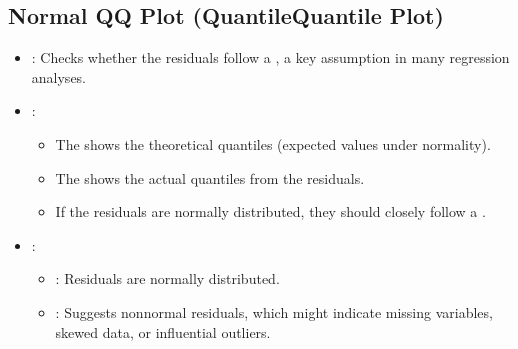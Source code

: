 \documentclass[letterpaper,10pt,english]{jupyterBook}
\begin{document}
\subsection{Normal Q\sphinxhyphen{}Q Plot (Quantile\sphinxhyphen{}Quantile Plot)}
\label{\detokenize{02:normal-q-q-plot-quantile-quantile-plot}}\begin{itemize}
\item {} 
\sphinxAtStartPar
{}: Checks whether the residuals follow a , a key assumption in many regression analyses.

\item {} 
\sphinxAtStartPar
{}:
\begin{itemize}
\item {} 
\sphinxAtStartPar
The  shows the theoretical quantiles (expected values under normality).

\item {} 
\sphinxAtStartPar
The  shows the actual quantiles from the residuals.

\item {} 
\sphinxAtStartPar
If the residuals are normally distributed, they should closely follow a .

\end{itemize}

\item {} 
\sphinxAtStartPar
{}:
\begin{itemize}
\item {} 
\sphinxAtStartPar
{}: Residuals are normally distributed.

\item {} 
\sphinxAtStartPar
{}: Suggests non\sphinxhyphen{}normal residuals, which might indicate missing variables, skewed data, or influential outliers.

\end{itemize}

\end{itemize}
\end{document}
